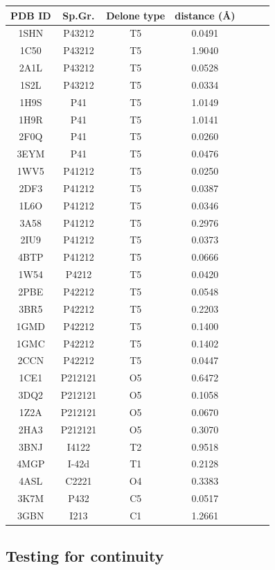 \documentclass[preprint]{iucr}              %
\begin{document}
\begin{table}
\begin{tabular}{ccccccc}
\bottomrule
\end{tabular}
\begin{tabular}{ccccccc}
	\toprule
	PDB ID & Sp.Gr. & Delone type&distance ({{\AA}}) \\ 
	\midrule
			1SHN&P43212&T5&0.0491\\ 
			1C50&P43212&T5&1.9040\\ 
			2A1L&P43212&T5&0.0528\\ 
			1S2L&P43212&T5&0.0334\\ 
			1H9S&P41&T5&1.0149\\ 
			1H9R&P41&T5&1.0141\\ 
			2F0Q&P41&T5&0.0260\\ 
			3EYM&P41&T5&0.0476\\ 
			1WV5&P41212&T5&0.0250\\ 
			2DF3&P41212&T5&0.0387\\ 
			1L6O&P41212&T5&0.0346\\ 
			3A58&P41212&T5&0.2976\\ 
			2IU9&P41212&T5&0.0373\\ 
			4BTP&P41212&T5&0.0666\\ 
			1W54&P4212&T5&0.0420\\ 
			2PBE&P42212&T5&0.0548\\ 
			3BR5&P42212&T5&0.2203\\ 
			1GMD&P42212&T5&0.1400\\ 
			1GMC&P42212&T5&0.1402\\ 
			2CCN&P42212&T5&0.0447\\ 
			1CE1&P212121&O5&0.6472\\ 
			3DQ2&P212121&O5&0.1058\\ 
			1Z2A&P212121&O5&0.0670\\ 
			2HA3&P212121&O5&0.3070\\ 
			3BNJ&I4122&T2&0.9518\\ 
			4MGP&I-42d&T1&0.2128\\ 
			4ASL&C2221&O4&0.3383\\ 
			3K7M&P432&C5&0.0517\\ 
			3GBN&I213&C1&1.2661\\ 
	\bottomrule
\end{tabular}

	\caption{}
\end{table}
\subsection{Testing for continuity}
\end{document}
